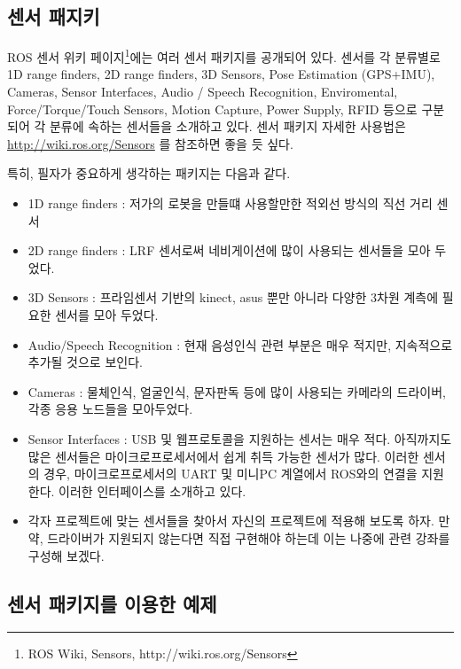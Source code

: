\subsection{센서 패지키}

ROS 센서 위키 페이지\footnote{ROS Wiki, Sensors, http://wiki.ros.org/Sensors}에는 여러 센서 패키지를 공개되어 있다. 센서를 각 분류별로 1D range finders, 2D range finders, 3D Sensors, Pose Estimation (GPS+IMU), Cameras, Sensor Interfaces, Audio / Speech Recognition, Enviromental, Force/Torque/Touch Sensors, Motion Capture, Power Supply, RFID 등으로 구분되어 각 분류에 속하는 센서들을 소개하고 있다. 센서 패키지 자세한 사용법은 \url{http://wiki.ros.org/Sensors} 를 참조하면 좋을 듯 싶다.

\noindent
특히, 필자가 중요하게 생각하는 패키지는 다음과 같다.

\begin{itemize}[leftmargin=*]
\item 1D range finders : 저가의 로봇을 만들떄 사용할만한 적외선 방식의 직선 거리 센서
\item 2D range finders : LRF 센서로써 네비게이션에 많이 사용되는 센서들을 모아 두었다.
\item 3D Sensors : 프라임센서 기반의 kinect, asus 뿐만 아니라 다양한 3차원 계측에 필요한 센서를 모아 두었다.
\item Audio/Speech Recognition : 현재 음성인식 관련 부분은 매우 적지만, 지속적으로 추가될 것으로 보인다.
\item Cameras : 물체인식, 얼굴인식, 문자판독 등에 많이 사용되는 카메라의 드라이버, 각종 응용 노드들을 모아두었다.
\item Sensor Interfaces : USB 및 웹프로토콜을 지원하는 센서는 매우 적다. 아직까지도 많은 센서들은 마이크로프로세서에서 쉽게 취득 가능한 센서가 많다. 이러한 센서의 경우, 마이크로프로세서의 UART 및 미니PC 계열에서 ROS와의 연결을 지원한다. 이러한 인터페이스를 소개하고 있다.
 \item 각자 프로젝트에 맞는 센서들을 찾아서 자신의 프로젝트에 적용해 보도록 하자. 만약, 드라이버가 지원되지 않는다면 직접 구현해야 하는데 이는 나중에 관련 강좌를 구성해 보겠다.
\end{itemize}

\subsection{센서 패키지를 이용한 예제}

